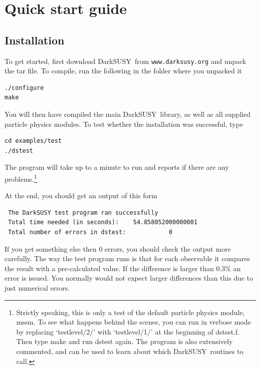 \documentclass[a4paper,10pt,oneside]{book}
\newcommand{\code}[1]{\ft{#1}}
\newcommand{\ds}{{\sffamily DarkSUSY}}
\newcommand{\ft}[1]{\textsf{#1}}
\begin{document}
\chapter{Quick start guide}

\section{Installation}
To get started, first download \ds\ from {\tt www.darksusy.org} and unpack the tar file. To compile, run the
following in the folder where you unpacked it

\begin{verbatim}
./configure
make
\end{verbatim}

You will then have compiled the main \ds\  library, as well as all supplied particle physics 
modules. To test whether the installation was successful, type

\begin{verbatim}
cd examples/test
./dstest
\end{verbatim}

The program will take up to a minute to run and reports if there are any problems.\footnote{
Strictly speaking, this is only a test of the default particle physics module, \code{mssm}.
To see what happens behind the scenes, you can run in verbose mode by 
replacing `\code{testlevel/2/}' with  `\code{testlevel/1/}' at the beginning of dstest.f. Then type \code{make} and run \code{dstest} again.
The program is also extensively commented, and can be used to learn about which \ds\ routines to call.
}

At the end, you should get an output of this form

\begin{verbatim}
 The DarkSUSY test program ran successfully
 Total time needed (in seconds):    54.858052000000001     
 Total number of errors in dstest:            0
\end{verbatim}

If you get something else then 0 errors, you should check the output more carefully. The way the test program runs is that for each observable it compares the result with a pre-calculated value. If the difference is larger than 0.3\% an error is issued. You normally would not expect larger differences than this due to just numerical errors.
\end{document}
